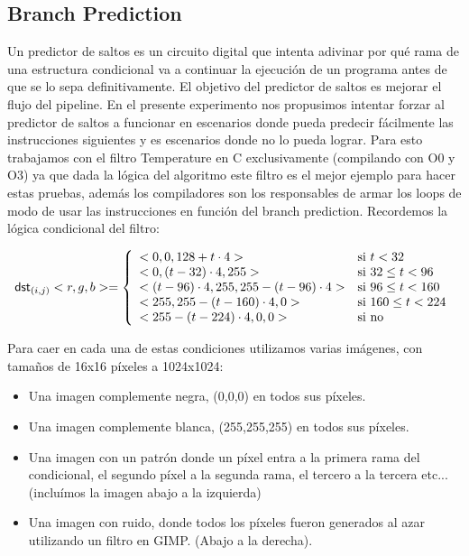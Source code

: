 \newpage
\subsection{Branch Prediction}

Un predictor de saltos es un circuito digital que intenta adivinar por qué rama de una estructura condicional va a continuar la ejecución de un programa antes de que se lo sepa definitivamente. El objetivo del predictor de saltos es mejorar el flujo del pipeline. En el presente experimento nos propusimos intentar forzar al predictor de saltos a funcionar en escenarios donde pueda predecir fácilmente las instrucciones siguientes y es escenarios donde no lo pueda lograr. Para esto trabajamos con el filtro Temperature en C exclusivamente (compilando con O0 y O3) ya que dada la lógica del algoritmo este filtro es el mejor ejemplo para hacer estas pruebas, además los compiladores son los responsables de armar los loops de modo de usar las instrucciones en función del branch prediction. Recordemos la lógica condicional del filtro:
\begin{center}
	\begin{displaymath}
	\mathsf{dst}_{(i,j)}<r,g,b> = \left\{
	\begin{array}{l l}
				<0,0, 128 + t \cdot 4> & \text{si }t < 32\\
				<0, (t - 32) \cdot 4, 255> & \text{si }32 \le t < 96\\
				<(t-96) \cdot 4, 255, 255 - (t-96) \cdot 4> & \text{si }96 \le t < 160\\
				<255, 255 - (t - 160) \cdot 4, 0> & \text{si }160 \le t < 224\\
				<255 - (t - 224) \cdot 4, 0 , 0> & \text{si no} \\
	\end{array}
	\right.
	\end{displaymath}
	\end{center}

Para caer en cada una de estas condiciones utilizamos varias imágenes, con tamaños de 16x16 píxeles a 1024x1024:

\begin{itemize}
	\item Una imagen complemente negra, (0,0,0) en todos sus píxeles.
	\item Una imagen complemente blanca, (255,255,255) en todos sus píxeles.
	\item Una imagen con un patrón donde un píxel entra a la primera rama del condicional, el segundo píxel a la segunda rama, el tercero a la tercera etc... (incluímos la imagen abajo a la izquierda)
	\item Una imagen con ruido, donde todos los píxeles fueron generados al azar utilizando un filtro en GIMP. (Abajo a la derecha).
\end{itemize}

